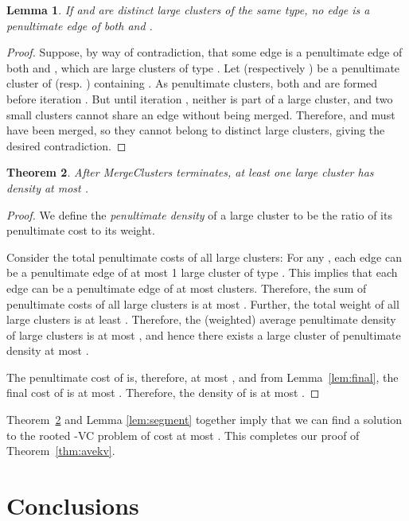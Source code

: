 \documentclass[11pt]{article}
\newtheorem{lemma}{Lemma}[section]
\newtheorem{theorem}[lemma]{Theorem}
\newcommand{\kvc}[1]{-{\sc VC} }
\newcommand{\kv}{\kvc{2}}
\begin{document}
\begin{lemma}\label{lem:penultimate}
  If  and  are distinct large clusters of the same type, no
  edge is a penultimate edge of both  and .
\end{lemma}
\begin{proof}
  Suppose, by way of contradiction, that some edge  is a
  penultimate edge of both  and , which are large clusters
  of type . Let  (respectively ) be a penultimate cluster
  of  (resp. ) containing . As penultimate clusters, both
   and  are formed before iteration . But until iteration
  , neither is part of a large cluster, and two small clusters
  cannot share an edge without being merged. Therefore,  and
   must have been merged, so they cannot belong to distinct large
  clusters, giving the desired contradiction.
\end{proof}

\begin{theorem}\label{thm:goodLargeCluster}
  After {\sc MergeClusters} terminates, at least one large cluster has
  density at most .
\end{theorem}
\begin{proof}
  We define the \emph{penultimate density} of a large cluster to be
  the ratio of its penultimate cost to its weight.

  Consider the total penultimate costs of all large clusters: For any
  , each edge  can be a penultimate edge of at most 1
  large cluster of type . This implies that each edge can be a
  penultimate edge of at most  clusters. Therefore, the
  sum of penultimate costs of all large clusters is at most
  . Further, the total weight of all large
  clusters is at least .  Therefore, the (weighted) average
  penultimate density of large clusters is at most , and hence there exists a
  large cluster  of penultimate density at most .

  The penultimate cost of  is, therefore, at most , and from Lemma~\ref{lem:final}, the final cost of 
  is at most .  Therefore, the density of  is at most
  .
\end{proof}

Theorem~\ref{thm:goodLargeCluster} and Lemma \ref{lem:segment}
together imply that we can find a solution to the rooted \kv problem
of cost at most . This completes our proof of
Theorem~\ref{thm:avekv}.



\section{Conclusions}
\label{sec:conclusion}
\end{document}
